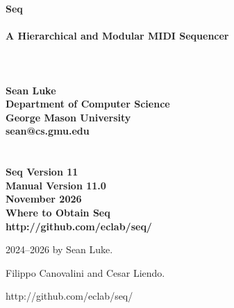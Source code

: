 \documentclass[twoside,10pt]{article}
\newcommand\booktitle{Seq\\~\vspace{0em}\\\LARGE A Hierarchical and Modular MIDI Sequencer\\}
\newcommand\reference[1]{\vspace{0.5em}\hfill{\parbox{6in}{\raggedleft\noindent\textsf{#1}}}}
\begin{document}

\noindent\Huge\bf \booktitle\\
\\
\\
\Large\bf Sean Luke\\
{\large\rm 
Department of Computer Science\\
George Mason University\\
sean@cs.gmu.edu}\\
\\
\\
\large\rm {\bf Seq Version 11}\\
\large\rm {\bf Manual Version 11.0}\\
\large\rm  November 2026\\

\vspace{5in}
\noindent\Large\bf Where to Obtain Seq\\
\large\rm http:/\!/github.com/eclab/seq/

\clearpage

\small 
{}  2024--2026 by Sean Luke.

\vspace{0.25in}
 Filippo Canovalini and Cesar Liendo.

\vspace{0.25in}


\reference{http:/\!/github.com/eclab/seq/}

\vspace{0.15in}
\end{document}
